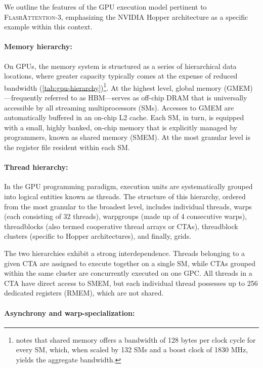 We outline the features of the GPU execution model pertinent to \textsc{FlashAttention-3}, emphasizing the NVIDIA Hopper architecture as a specific example within this context.

\paragraph{Memory hierarchy:} On GPUs, the memory system is structured as a series of hierarchical data locations, where greater capacity typically comes at the expense of reduced bandwidth (\cref{tab:gpu-hierarchy})\footnote{\citet{luo2024benchmarking} notes that shared memory offers a bandwidth of 128 bytes per clock cycle for every SM, which, when scaled by 132 SMs and a boost clock of 1830 MHz, yields the aggregate bandwidth.}. At the highest level, global memory (GMEM)—frequently referred to as HBM—serves as off-chip DRAM that is universally accessible by all streaming multiprocessors (SMs). Accesses to GMEM are automatically buffered in an on-chip L2 cache. Each SM, in turn, is equipped with a small, highly banked, on-chip memory that is explicitly managed by programmers, known as shared memory (SMEM). At the most granular level is the register file resident within each SM.

\paragraph{Thread hierarchy:} In the GPU programming paradigm, execution units are systematically grouped into logical entities known as threads. The structure of this hierarchy, ordered from the most granular to the broadest level, includes individual threads, warps (each consisting of 32 threads), warpgroups (made up of 4 consecutive warps), threadblocks (also termed cooperative thread arrays or CTAs), threadblock clusters (specific to Hopper architectures), and finally, grids.

The two hierarchies exhibit a strong interdependence. Threads belonging to a given CTA are assigned to execute together on a single SM, while CTAs grouped within the same cluster are concurrently executed on one GPC. All threads in a CTA have direct access to SMEM, but each individual thread possesses up to 256 dedicated registers (RMEM), which are not shared.

\paragraph{Asynchrony and warp-specialization:}


